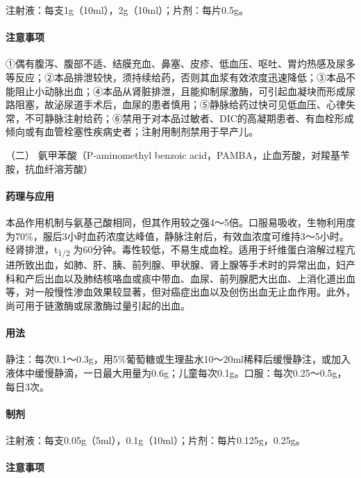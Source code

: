 注射液：每支1g（10ml），2g（10ml）；片剂：每片0.5g。

\paragraph{注意事项}

①偶有腹泻、腹部不适、结膜充血、鼻塞、皮疹、低血压、呕吐、胃灼热感及尿多等反应；②本品排泄较快，须持续给药，否则其血浆有效浓度迅速降低；③本品不能阻止小动脉出血；④本品从肾脏排泄，且能抑制尿激酶，可引起血凝块而形成尿路阻塞，故泌尿道手术后，血尿的患者慎用；⑤静脉给药过快可见低血压、心律失常，不可静脉注射给药；⑥禁用于对本品过敏者、DIC的高凝期患者、有血栓形成倾向或有血管栓塞性疾病史者；注射用制剂禁用于早产儿。

\hypertarget{text00438.htmlux5cux23CHP17-8-2-2}{}
（二） 氨甲苯酸（P-aminomethyl benzoic
acid，PAMBA，止血芳酸，对羧基苄胺，抗血纤溶芳酸）

\paragraph{药理与应用}

本品作用机制与氨基己酸相同，但其作用较之强4～5倍。口服易吸收，生物利用度为70\%，服后3小时血药浓度达峰值，静脉注射后，有效血浓度可维持3～5小时。经肾排泄，t\textsubscript{1/2}
为60分钟。毒性较低，不易生成血栓。适用于纤维蛋白溶解过程亢进所致出血，如肺、肝、胰、前列腺、甲状腺、肾上腺等手术时的异常出血，妇产科和产后出血以及肺结核咯血或痰中带血、血尿、前列腺肥大出血、上消化道出血等，对一般慢性渗血效果较显著，但对癌症出血以及创伤出血无止血作用。此外，尚可用于链激酶或尿激酶过量引起的出血。

\paragraph{用法}

静注：每次0.1～0.3g，用5\%葡萄糖或生理盐水10～20ml稀释后缓慢静注，或加入液体中缓慢静滴，一日最大用量为0.6g；儿童每次0.1g。口服：每次0.25～0.5g，每日3次。

\paragraph{制剂}

注射液：每支0.05g（5ml），0.1g（10ml）；片剂：每片0.125g，0.25g。

\paragraph{注意事项}

